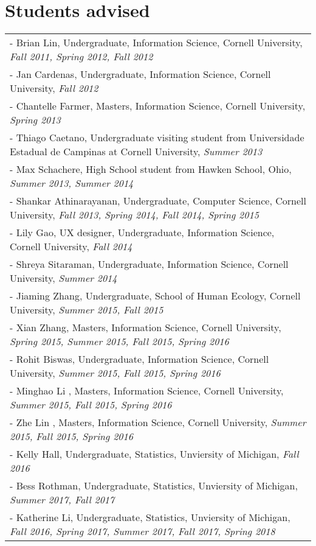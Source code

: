 \documentclass[10pt,fullpage]{article}
\begin{document}
\vspace{0.7em}
\section*{\textbf{Students advised}}
\vspace{-0.5em}
\begin{longtable}{>{\everypar{\hangindent0.2in}}p{6in}}
	- Brian Lin, Undergraduate, Information Science, Cornell University, \textit{Fall 2011, Spring 2012, Fall 2012}\\
	- Jan Cardenas, Undergraduate, Information Science, Cornell University, \textit{Fall 2012}\\
	- Chantelle Farmer, Masters, Information Science, Cornell University, \textit{Spring 2013}\\
	- Thiago Caetano, Undergraduate visiting student from Universidade Estadual de Campinas at Cornell University, \textit{Summer 2013}\\
	- Max Schachere, High School student from Hawken School, Ohio, \textit{Summer 2013, Summer 2014}\\
	- Shankar Athinarayanan, Undergraduate, Computer Science, Cornell University, \textit{Fall 2013, Spring 2014, Fall 2014, Spring 2015}\\
	- Lily Gao, UX designer, Undergraduate, Information Science, Cornell University, \textit{Fall 2014}\\
	- Shreya Sitaraman, Undergraduate, Information Science, Cornell University, \textit{Summer 2014}\\
	- Jiaming Zhang, Undergraduate, School of Human Ecology, Cornell University, \textit{Summer 2015, Fall 2015}\\
	- Xian Zhang, Masters, Information Science, Cornell University, \textit{Spring 2015, Summer 2015, Fall 2015, Spring 2016}\\
	- Rohit Biswas, Undergraduate, Information Science, Cornell University, \textit{Summer 2015, Fall 2015, Spring 2016}\\
	- Minghao Li , Masters, Information Science, Cornell University, \textit{Summer 2015, Fall 2015, Spring 2016}\\
	- Zhe Lin , Masters, Information Science, Cornell University, \textit{Summer 2015, Fall 2015, Spring 2016}\\
	- Kelly Hall, Undergraduate, Statistics, Unviersity of Michigan, \textit{Fall 2016}\\
	- Bess Rothman, Undergraduate, Statistics, Unviersity of Michigan, \textit{Summer 2017, Fall 2017}\\
	- Katherine Li, Undergraduate, Statistics, Unviersity of Michigan, \textit{Fall 2016, Spring 2017, Summer 2017, Fall 2017, Spring 2018}
\end{longtable}
\end{document}
